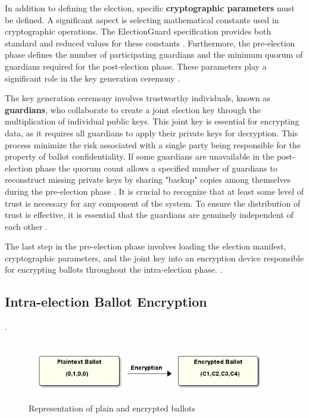 In addition to defining the election, specific \textbf{cryptographic parameters} must be defined. A significant aspect is selecting mathematical constants used in cryptographic operations. The ElectionGuard specification provides both standard and reduced values for these constants \cite[21, 36-38]{eg-spec}. Furthermore, the pre-election phase defines the number of participating guardians and the minimum quorum of guardians required for the post-election phase. These parameters play a significant role in the key generation ceremony \cite[8-9]{eg-paper}.

The key generation ceremony involves trustworthy individuals, known as \textbf{guardians}, who collaborate to create a joint election key through the multiplication of individual public keys. This joint key is essential for encrypting data, as it requires all guardians to apply their private keys for decryption. This process minimize the risk associated with a single party being responsible for the property of ballot confidentiality. If some guardians are unavailable in the post-election phase the quorum count allows a specified number of guardians to reconstruct missing private keys by sharing "backup" copies among themselves during the pre-election phase \cite[8]{eg-paper}  \cite{eg-docs}. It is crucial to recognize that at least some level of trust is necessary for any component of the system. To ensure the distribution of trust is effective, it is essential that the guardians are genuinely independent of each other \cite[92]{stuve-study}.

The last step in the pre-election phase involves loading the election manifest, cryptographic parameters, and the joint key into an encryption device responsible for encrypting ballots throughout the intra-election phase. \cite[8]{eg-paper}.

\subsection{Intra-election Ballot Encryption}.
\begin{figure}
    \centering
    \includegraphics[scale=.5]{abbildungen/Diagramme/ballotencryption.png}
    \caption{Representation of plain and encrypted ballots} \label{Fig:ballot-representation}
\end{figure}


